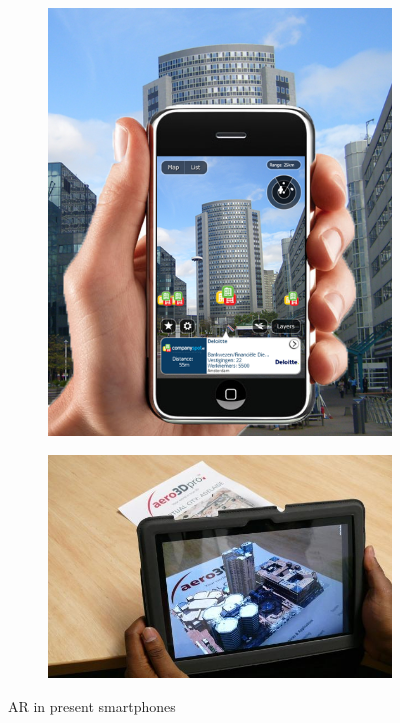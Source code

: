 \documentclass[12pt,twocolumn,letterpaper]{article}
\begin{document}
\begin{figure}
\begin{subfigure}{0.2\textwidth}
\includegraphics[scale=0.16]{images/AR_now}
\end{subfigure}
\begin{subfigure}{0.2\textwidth}
\includegraphics[scale=0.22]{images/AR_now1}
\end{subfigure}
\caption{AR in present smartphones}
\label{fig:arnow}
\end{figure}
\end{document}

